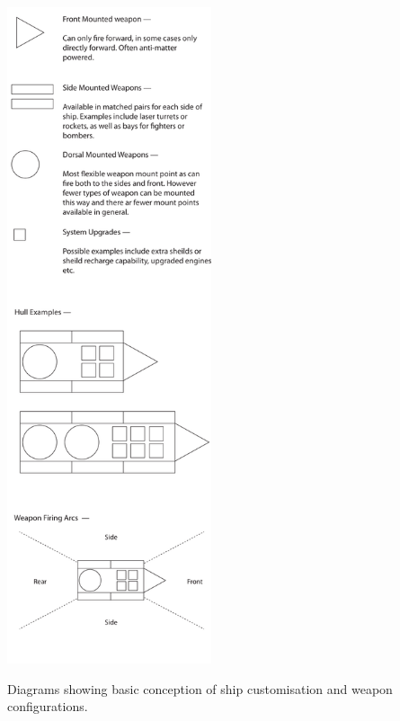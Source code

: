 \begin{marginfigure}
	\includegraphics[width=6cm]{res/design/ship_design}
	\caption{Diagrams showing basic conception of ship customisation and weapon configurations. }
	\label{fig:ship_design}
\end{marginfigure}

